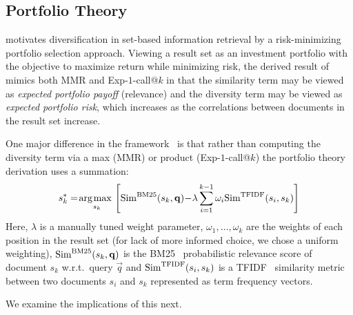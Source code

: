 \subsection{Portfolio Theory}
\cite{wang09PortfolioTheory} motivates
diversification in set-based information retrieval by a
risk-minimizing portfolio selection approach. Viewing a result set as
an investment portfolio with the objective to maximize return while
minimizing risk, the derived result of~\cite{wang09PortfolioTheory}
mimics both MMR and Exp-$1$-call@$k$ in that the similarity term may
be viewed as \emph{expected portfolio payoff} (relevance) and the
diversity term may be viewed as \emph{expected portfolio risk}, which
increases as the correlations between documents in the result set
increase. 

One major difference in the
framework~\cite{wang09PortfolioTheory} is that rather than computing
the diversity term via a max (MMR) or product (Exp-$1$-call@$k$) the
portfolio theory derivation uses a summation: 
\begin{align}
s_{k}^{*} = \argmax_{s_{k}} \left[ \Sim^{\text{BM25}}(s_k,\vec{q}) \hspace{-.7mm} - \hspace{-.7mm} \lambda \sum_{i=1}^{k-1} \omega_{i} \Sim^{\text{TFIDF}}(s_i,s_k) \right]
\end{align}
Here, $\lambda$ is a manually tuned weight parameter, $\omega_1,\ldots,\omega_k$
are the weights of each position in the result set (for lack of more informed
choice, we chose a uniform weighting),
$\Sim^{\text{BM25}}(s_k,\vec{q})$ is the BM25~\citep{bm25} probabilistic
relevance score of document $s_k$ w.r.t.\ query $\vec{q}$ and
$\Sim^{\text{TFIDF}}(s_i,s_k)$ is a TFIDF~\citep{salton83Introduction}
similarity metric between two documents $s_i$ and $s_k$ represented as term
frequency vectors.


We examine the implications of this next.


